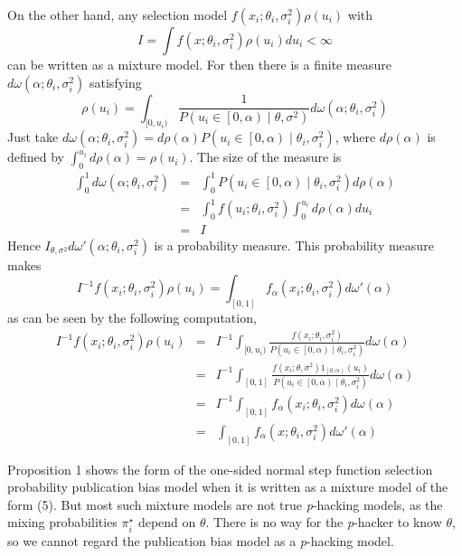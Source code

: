 On the other hand, any selection model $f(x_{i};\theta_{i},\sigma^2_{i})\rho(u_i)$ with $$I =\int f(x;\theta_{i},\sigma^2_{i})\rho(u_i)du_i<\infty$$ can be written as a mixture model. For then there is a finite measure $d\omega(\alpha;\theta_{i},\sigma^2_{i})$ satisfying 
\[
\rho(u_i)=\int_{[0,u_i)}\frac{1}{P(u_i\in\left[0,\alpha\right)\mid\theta,\sigma^2)}d\omega(\alpha;\theta_{i},\sigma^2_{i})
\]
Just take $d\omega(\alpha;\theta_{i},\sigma^2_{i})=d\rho(\alpha)P(u_i\in\left[0,\alpha\right)\mid\theta_{i},\sigma^2_{i})$, where $d\rho(\alpha)$ is defined by $\int_{0}^{u_i}d\rho(\alpha)=\rho(u_i)$. The size of the measure is
\begin{eqnarray*}
\int_{0}^{1}d\omega(\alpha;\theta_{i},\sigma^2_{i}) & = & \int_{0}^{1}P(u_i\in\left[0,\alpha\right)\mid\theta_{i},\sigma^2_{i})d\rho(\alpha)\\
 & = & \int_{0}^{1}f(u_i;\theta_{i},\sigma^2_{i})\int_{0}^{u_i}d\rho(\alpha)du_i\\
 & = & I
\end{eqnarray*}
Hence $I_{\theta,\sigma^2}d\omega'(\alpha;\theta_{i},\sigma^2_{i})$ is a probability measure. This probability measure makes 
\[
I^{-1}f(x_{i};\theta_{i},\sigma^2_{i})\rho(u_i)=\int_{[0,1]}f_\alpha(x_{i};\theta_{i},\sigma^2_{i})d\omega'(\alpha)
\]
as can be seen by the following computation,
\begin{eqnarray*}
I^{-1}f(x_{i};\theta_{i},\sigma^2_{i})\rho(u_i) & = & I^{-1}\int_{[0,u_i)}\frac{f(x_{i};\theta_{i},\sigma^2_{i})}{P(u_i\in\left[0,\alpha\right)\mid\theta_{i},\sigma^2_{i})}d\omega(\alpha)\\
 & = & I^{-1}\int_{[0,1]}\frac{f(x_{i};\theta,\sigma^2)1_{\left[0,\alpha\right)}(u_i)}{P(u_i\in\left[0,\alpha\right)\mid\theta_{i},\sigma^2_{i})}d\omega(\alpha)\\
 & = & I^{-1}\int_{[0,1]}f_\alpha(x_{i};\theta_{i},\sigma^2_{i})d\omega(\alpha)\\
 & = & \int_{[0,1]}f_\alpha(x;\theta_{i},\sigma^2_{i})d\omega'(\alpha)
\end{eqnarray*}

Proposition 1 shows the form of the one-sided normal step function selection probability publication bias model when it is written as a mixture model of the form (5). But most such mixture models are not true \textit{p}-hacking models, as the mixing probabilities $\pi_{i}^{\star}$ depend on $\theta$. There is no way for the \textit{p}-hacker to know
$\theta$, so we cannot regard the publication bias model as a \textit{p}-hacking model.